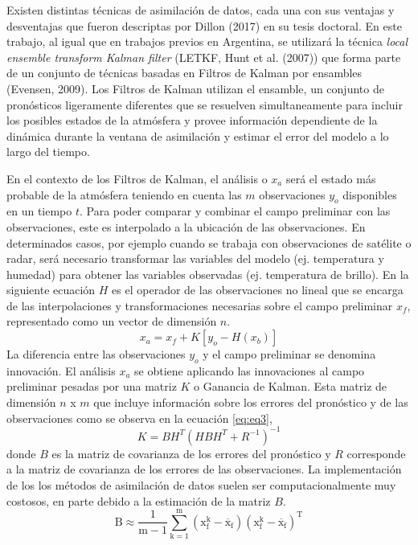 \documentclass[12pt,oneside]{reedthesis}
\begin{document}
Existen distintas técnicas de asimilación de datos, cada una con sus ventajas y desventajas que fueron descriptas por Dillon (2017) en su tesis doctoral. En este trabajo, al igual que en trabajos previos en Argentina, se utilizará la técnica \emph{local ensemble transform Kalman filter} (LETKF, Hunt et al. (2007)) que forma parte de un conjunto de técnicas basadas en Filtros de Kalman por ensambles (Evensen, 2009). Los Filtros de Kalman utilizan el ensamble, un conjunto de pronósticos ligeramente diferentes que se resuelven simultaneamente para incluir los posibles estados de la atmósfera y provee información dependiente de la dinámica durante la ventana de asimilación y estimar el error del modelo a lo largo del tiempo.

En el contexto de los Filtros de Kalman, el análisis o \(x_a\) será el estado más probable de la atmósfera teniendo en cuenta las \(m\) observaciones \(y_o\) disponibles en un tiempo \(t\). Para poder comparar y combinar el campo preliminar con las observaciones, este es interpolado a la ubicación de las observaciones. En determinados casos, por ejemplo cuando se trabaja con observaciones de satélite o radar, será necesario transformar las variables del modelo (ej. temperatura y humedad) para obtener las variables observadas (ej. temperatura de brillo). En la siguiente ecuación \(H\) es el operador de las observaciones no lineal que se encarga de las interpolaciones y transformaciones necesarias sobre el campo preliminar \(x_f\), representado como un vector de dimensión \(n\).
\begin{equation}
  x_a = x_f + K[y_o - H(x_b )]
  \label{eq:eq1}
\end{equation}
La diferencia entre las observaciones \(y_o\) y el campo preliminar se denomina innovación. El análisis \(x_a\) se obtiene aplicando las innovaciones al campo preliminar pesadas por una matriz \(K\) o Ganancia de Kalman. Esta matriz de dimensión \(n\) x \(m\) que incluye información sobre los errores del pronóstico y de las observaciones como se observa en la ecuación \eqref{eq:eq3},
\begin{equation}
  K = BH^T (HBH^T + R^{-1})^{-1}
  \label{eq:eq3}
\end{equation}
donde \(B\) es la matriz de covarianza de los errores del pronóstico y \(R\) corresponde a la matriz de covarianza de los errores de las observaciones. La implementación de los los métodos de asimilación de datos suelen ser computacionalmente muy costosos, en parte debido a la estimación de la matriz \(B\).
\begin{equation}
  \mathrm{ B \approx \frac{1}{m-1} \sum_{k=1}^{m}(x_{f}^{k}-\overline{x}_f)(x_{f}^{k}-\overline{x}_f)^T}
  \label{eq:eq5}
\end{equation}
\end{document}
